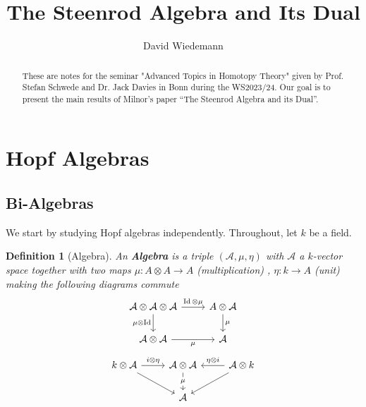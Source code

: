 \documentclass[11pt, a4paper]{article}
\DeclareMathOperator*{\id}{Id}
\newtheorem{defn}{Definition}
\theoremstyle{plain}
\begin{document}
\title{The Steenrod Algebra and Its Dual }
\author{David Wiedemann}
\maketitle
\begin{abstract}
	These are notes for the seminar "Advanced Topics in Homotopy Theory" given by Prof. Stefan Schwede and Dr. Jack Davies in Bonn during the WS2023/24. Our goal is to present the main results of Milnor's paper ``The Steenrod Algebra and its Dual''.
\end{abstract}

\section{Hopf Algebras}
\subsection{Bi-Algebras}
We start by studying Hopf algebras independently. 
Throughout, let $k$ be a field.
\begin{defn}[Algebra]
	An \textbf{Algebra} is a triple $\left( \mathcal{A},\mu, \eta\right) $ with $\mathcal{A}$ a $k$-vector space together with two maps   $\mu\colon A\otimes A \to A$ (multiplication) , $\eta\colon k \to A$ (unit)  making the following diagrams commute
\[\begin{tikzcd}
	{\mathcal{A} \otimes \mathcal{A}\otimes \mathcal{A}} & {A\otimes \mathcal{A}} \\
	{\mathcal{A}\otimes \mathcal{A}} & {\mathcal{A}}
	\arrow["\id\otimes\mu", from=1-1, to=1-2]
	\arrow["\mu", from=1-2, to=2-2]
	\arrow["\mu"', from=2-1, to=2-2]
	\arrow["{\mu\otimes \id}"', from=1-1, to=2-1]
\end{tikzcd}\]
\[\begin{tikzcd}
	{k\otimes \mathcal{A}} & {\mathcal{A}\otimes\mathcal{A}} & {\mathcal{A}\otimes k} \\
	& {\mathcal{A}}
	\arrow["{\eta\otimes i}"', from=1-3, to=1-2]
	\arrow["i\otimes\eta", from=1-1, to=1-2]
	\arrow[from=1-1, to=2-2]
	\arrow[from=1-3, to=2-2]
	\arrow["\mu"{description}, from=1-2, to=2-2]
\end{tikzcd}\]
\end{defn}
\end{document}
